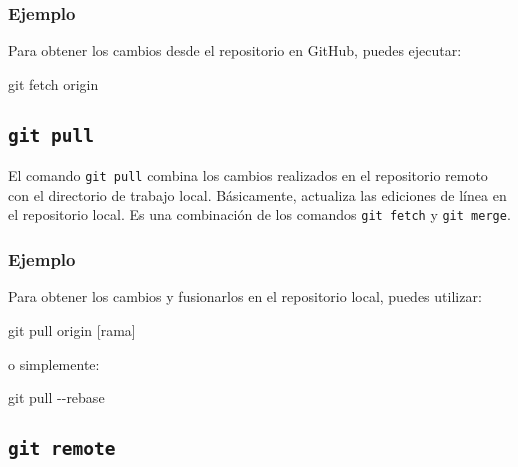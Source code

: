 \documentclass[
  letterpaper,
  DIV=11,
  numbers=noendperiod]{scrartcl}
\newenvironment{Shaded}{}{}
\newcommand{\AttributeTok}[1]{\textcolor[rgb]{0.84,0.23,0.29}{#1}}
\newcommand{\FunctionTok}[1]{\textcolor[rgb]{0.44,0.26,0.76}{#1}}
\newcommand{\NormalTok}[1]{\textcolor[rgb]{0.14,0.16,0.18}{#1}}
\newcommand{\PreprocessorTok}[1]{\textcolor[rgb]{0.84,0.23,0.29}{#1}}
\newcommand{\SpecialStringTok}[1]{\textcolor[rgb]{0.01,0.18,0.38}{#1}}
\begin{document}
\hypertarget{ejemplo}{%
\subsubsection{Ejemplo}\label{ejemplo}}

Para obtener los cambios desde el repositorio en GitHub, puedes
ejecutar:

\begin{Shaded}
\begin{Highlighting}[]
\FunctionTok{git}\NormalTok{ fetch origin}
\end{Highlighting}
\end{Shaded}

\hypertarget{git-pull}{%
\subsection{\texorpdfstring{\texttt{git\ pull}}{git pull}}\label{git-pull}}

El comando \texttt{git\ pull} combina los cambios realizados en el
repositorio remoto con el directorio de trabajo local. Básicamente,
actualiza las ediciones de línea en el repositorio local. Es una
combinación de los comandos \texttt{git\ fetch} y \texttt{git\ merge}.

\hypertarget{ejemplo-1}{%
\subsubsection{Ejemplo}\label{ejemplo-1}}

Para obtener los cambios y fusionarlos en el repositorio local, puedes
utilizar:

\begin{Shaded}
\begin{Highlighting}[]
\FunctionTok{git}\NormalTok{ pull origin }\PreprocessorTok{[}\SpecialStringTok{rama}\PreprocessorTok{]}
\end{Highlighting}
\end{Shaded}

o simplemente:

\begin{Shaded}
\begin{Highlighting}[]
\FunctionTok{git}\NormalTok{ pull }\AttributeTok{{-}{-}rebase}
\end{Highlighting}
\end{Shaded}

\hypertarget{git-remote}{%
\subsection{\texorpdfstring{\texttt{git\ remote}}{git remote}}\label{git-remote}}
\end{document}
